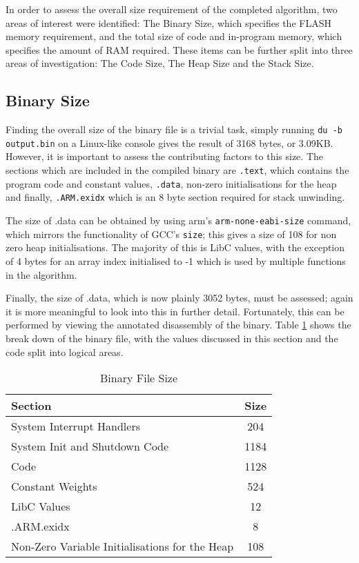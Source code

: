 
In order to assess the overall size requirement of the completed algorithm, two areas of interest were identified: The Binary Size, which specifies the FLASH memory requirement, and the total size of code and in-program memory, which specifies the amount of RAM required. These items can be further split into three areas of investigation: The Code Size, The Heap Size and the Stack Size.

\subsection{Binary Size}

Finding the overall size of the binary file is a trivial task, simply running \verb|du -b output.bin| on a Linux-like console gives the result of 3168 bytes, or 3.09KB. However, it is important to assess the contributing factors to this size. The sections which are included in the compiled binary are \verb|.text|, which contains the program code and constant values, \verb|.data|, non-zero initialisations for the heap and finally, \verb|.ARM.exidx| which is an 8 byte section required for stack unwinding.

The size of .data can be obtained by using arm's \verb|arm-none-eabi-size| command, which mirrors the functionality of GCC's \verb|size|; this gives a size of 108 for non zero heap initialisations. The majority of this is LibC values, with the exception of 4 bytes for an array index initialised to -1 which is used by multiple functions in the algorithm.

Finally, the size of .data, which is now plainly 3052 bytes, must be assessed; again it is more meaningful to look into this in further detail. Fortunately, this can be performed by viewing the annotated disassembly of the binary. Table \ref{tab:prog-size} shows the break down of the binary file, with the values discussed in this section and the code split into logical areas.

\begin{table}[h]
    \centering
    \begin{tabular}{|l|c|}
        \hline
        Section & Size \\
        \hline
        System Interrupt Handlers & 204 \\
        System Init and Shutdown Code & 1184 \\
        Code & 1128 \\
        Constant Weights & 524 \\
        LibC Values & 12 \\
        .ARM.exidx & 8 \\
        Non-Zero Variable Initialisations for the Heap & 108 \\
        \hline
    \end{tabular}
    \caption{Binary File Size \label{tab:prog-size}}
\end{table}

